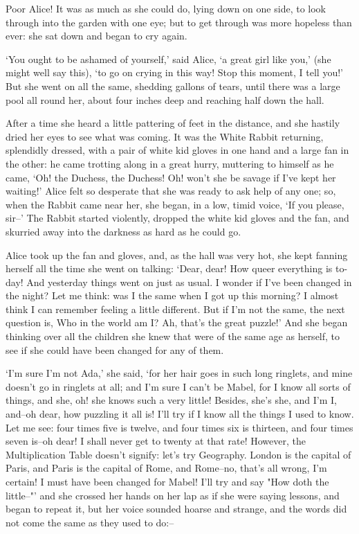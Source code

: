 \documentclass[statementpaper,twoside,openany]{memoir}
\begin{document}
Poor Alice! It was as much as she could do, lying down on one side, to look through into the garden with one eye; but to get through was more hopeless than ever: she sat down and began to cry again.

`You ought to be ashamed of yourself,' said Alice, `a great girl like you,' (she might well say this), `to go on crying in this way! Stop this moment, I tell you!' But she went on all the same, shedding gallons of tears, until there was a large pool all round her, about four inches deep and reaching half down the hall.

After a time she heard a little pattering of feet in the distance, and she hastily dried her eyes to see what was coming. It was the White Rabbit returning, splendidly dressed, with a pair of white kid gloves in one hand and a large fan in the other: he came trotting along in a great hurry, muttering to himself as he came, `Oh! the Duchess, the Duchess! Oh! won't she be savage if I've kept her waiting!' Alice felt so desperate that she was ready to ask help of any one; so, when the Rabbit came near her, she began, in a low, timid voice, `If you please, sir--' The Rabbit started violently, dropped the white kid gloves and the fan, and skurried away into the darkness as hard as he could go.

Alice took up the fan and gloves, and, as the hall was very hot, she kept fanning herself all the time she went on talking: `Dear, dear! How queer everything is to-day! And yesterday things went on just as usual. I wonder if I've been changed in the night? Let me think: was I the same when I got up this morning? I almost think I can remember feeling a little different. But if I'm not the same, the next question is, Who in the world am I? Ah, that's the great puzzle!' And she began thinking over all the children she knew that were of the same age as herself, to see if she could have been changed for any of them.

`I'm sure I'm not Ada,' she said, `for her hair goes in such long ringlets, and mine doesn't go in ringlets at all; and I'm sure I can't be Mabel, for I know all sorts of things, and she, oh! she knows such a very little! Besides, she's she, and I'm I, and--oh dear, how puzzling it all is! I'll try if I know all the things I used to know. Let me see: four times five is twelve, and four times six is thirteen, and four times seven is--oh dear! I shall never get to twenty at that rate! However, the Multiplication Table doesn't signify: let's try Geography. London is the capital of Paris, and Paris is the capital of Rome, and Rome--no, that's all wrong, I'm certain! I must have been changed for Mabel! I'll try and say "How doth the little--"' and she crossed her hands on her lap as if she were saying lessons, and began to repeat it, but her voice sounded hoarse and strange, and the words did not come the same as they used to do:--
\end{document}
